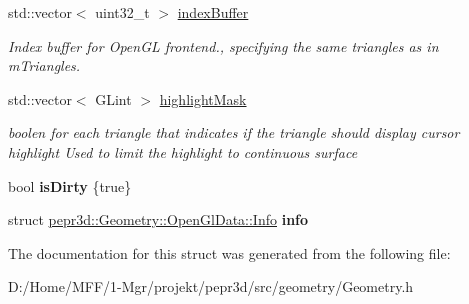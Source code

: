 \begin{DoxyCompactItemize}
std\+::vector$<$ uint32\+\_\+t $>$ \mbox{\hyperlink{structpepr3d_1_1_geometry_1_1_open_gl_data_ad66b73ae688939f518a57411a9f02671}{index\+Buffer}}
\begin{DoxyCompactList}\small\item\em Index buffer for Open\+GL frontend., specifying the same triangles as in m\+Triangles. \end{DoxyCompactList}\item 
\mbox{\label{structpepr3d_1_1_geometry_1_1_open_gl_data_a8c61b7f1139d0a7fa632ab221546e81b}} 
std\+::vector$<$ G\+Lint $>$ \mbox{\hyperlink{structpepr3d_1_1_geometry_1_1_open_gl_data_a8c61b7f1139d0a7fa632ab221546e81b}{highlight\+Mask}}
\begin{DoxyCompactList}\small\item\em boolen for each triangle that indicates if the triangle should display cursor highlight Used to limit the highlight to continuous surface \end{DoxyCompactList}\item 
\mbox{\label{structpepr3d_1_1_geometry_1_1_open_gl_data_ab219bc2425e6580d0667d3165b9c660b}} 
bool {\bfseries is\+Dirty} \{true\}
\item 
\mbox{\label{structpepr3d_1_1_geometry_1_1_open_gl_data_a1960dd95c0c38dda4a26422de4c981b4}} 
struct \mbox{\hyperlink{structpepr3d_1_1_geometry_1_1_open_gl_data_1_1_info}{pepr3d\+::\+Geometry\+::\+Open\+Gl\+Data\+::\+Info}} {\bfseries info}
\end{DoxyCompactItemize}


The documentation for this struct was generated from the following file\+:\begin{DoxyCompactItemize}
\item 
D\+:/\+Home/\+M\+F\+F/1-\/\+Mgr/projekt/pepr3d/src/geometry/Geometry.\+h\end{DoxyCompactItemize}

